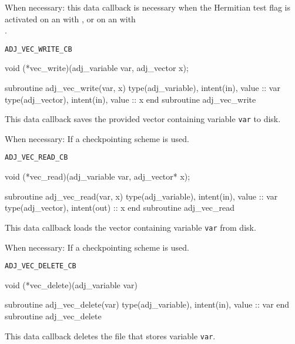 When necessary: this data callback is necessary when the Hermitian test flag is
activated on an  with ,
or on an  with \\.

\begin{boxwithtitle}{\texttt{ADJ_VEC_WRITE_CB}}
\begin{minipage}{\columnwidth}
\begin{ccode}
  void (*vec_write)(adj_variable var, adj_vector x);
\end{ccode}
\begin{fortrancode}
  subroutine adj_vec_write(var, x) 
    type(adj_variable), intent(in), value :: var
    type(adj_vector), intent(in), value :: x
  end subroutine adj_vec_write
\end{fortrancode}
\end{minipage}
\end{boxwithtitle}
This data callback saves the provided vector containing variable \texttt{var} to disk. 

When necessary: If a checkpointing scheme is used.

\begin{boxwithtitle}{\texttt{ADJ_VEC_READ_CB}}
\begin{minipage}{\columnwidth}
\begin{ccode}
  void (*vec_read)(adj_variable var, adj_vector* x);
\end{ccode}
\begin{fortrancode}
  subroutine adj_vec_read(var, x) 
    type(adj_variable), intent(in), value :: var
    type(adj_vector), intent(out) :: x
  end subroutine adj_vec_read
\end{fortrancode}
\end{minipage}
\end{boxwithtitle}
This data callback loads the vector containing variable \texttt{var} from disk.

When necessary: If a checkpointing scheme is used.

\begin{boxwithtitle}{\texttt{ADJ_VEC_DELETE_CB}}
\begin{minipage}{\columnwidth}
\begin{ccode}
  void (*vec_delete)(adj_variable var)
\end{ccode}
\begin{fortrancode}
  subroutine adj_vec_delete(var) 
    type(adj_variable), intent(in), value :: var
  end subroutine adj_vec_delete
\end{fortrancode}
\end{minipage}
\end{boxwithtitle}
This data callback deletes the file that stores variable \texttt{var}. 

